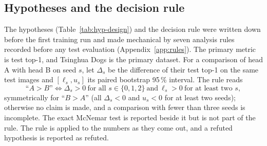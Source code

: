 \documentclass[11pt,a4paper]{article}
\theoremstyle{plain}
\begin{document}
\subsection{Hypotheses and the decision rule}\label{sec:rule}
The hypotheses (Table~\ref{tab:hyp-design}) and the decision rule were written down before the first training run
and made mechanical by seven analysis rules recorded before any test evaluation (Appendix~\ref{app:rules}). The primary
metric is test top-1, and Tsinghua Dogs is the primary dataset. For a comparison of head A with head B on seed $s$,
let $\Delta_s$ be the difference of their test top-1 on the same test images and $[\ell_s,u_s]$ its paired bootstrap
95\,\% interval. The rule reads
\begin{equation}
\text{``$A>B$''}\iff\Delta_s>0\ \text{for all } s\in\{0,1,2\}\ \text{and}\ \ell_s>0\ \text{for at least two } s,
\label{eq:rule}
\end{equation}
symmetrically for ``$B>A$'' (all $\Delta_s<0$ and $u_s<0$ for at least two seeds); otherwise no claim is made, and a
comparison with fewer than three seeds is incomplete. The exact McNemar test is reported beside it but is not part of
the rule. The rule is applied to the numbers as they come out, and a refuted hypothesis is reported as refuted.
\end{document}
